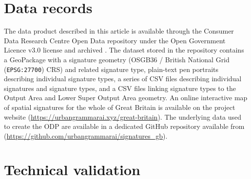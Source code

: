 \documentclass[fleqn,10pt]{wlscirep}
\begin{document}
\section*{Data records}
The data product \cite{fleischmannmartin2021Geographical} described in this article is available through the Consumer Data
Research Centre Open Data repository \cite{cdrc}
under the Open Government Licence v3.0 license and archived \cite{fleischmannmartin2021Geographical}.
The dataset stored in the repository contains a GeoPackage with a signature geometry
(OSGB36 / British National Grid (\texttt{EPSG:27700}) CRS) and related signature type,
plain-text pen portraits describing individual signature types, a series of CSV files
describing individual signatures and signature types, and a CSV files linking signature
types to the Output Area and Lower Super Output Area geometry. An online interactive map
of spatial signatures for the whole of Great Britain is available on the project website
(\hyperlink{https://urbangrammarai.xyz/great-britain}{https://urbangrammarai.xyz/great-britain}).
The underlying data used to create the ODP are available in a dedicated GitHub repository
available from (\hyperlink{https://github.com/urbangrammarai/signatures\_gb}{https://github.com/urbangrammarai/signatures\_gb}).
\section*{Technical validation}
\end{document}
